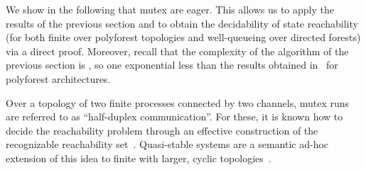\documentclass{LMCS}
\newenvironment{remark}{\begin{rem}}{\end{rem}}
\begin{document}
We show in the following that mutex \qcp are eager.  This
allows us to apply the results of the previous section and to obtain
the decidability of state reachability (for both finite \qcp
over polyforest topologies and well-queueing \rqcp over directed
forests)  via a direct
proof. Moreover, recall that the complexity of the algorithm of the
previous section is \dexptime, so one exponential less than the
results obtained  in~\cite{latorre-s-2007-161-a} for polyforest architectures.

\begin{remark}
  Over a topology of two finite
  processes connected by two channels, mutex runs are referred to as
  ``half-duplex communication''.
  For these, it is known how to decide the
  reachability problem through an effective construction of the
  recognizable reachability set~\cite{cece-g-2005-166-a}.
  Quasi-stable  systems are a semantic ad-hoc extension of
  this idea to finite \qcp with larger, cyclic
  topologies~\cite{cece-g-1997-304-a}.
\end{remark}
\end{document}
